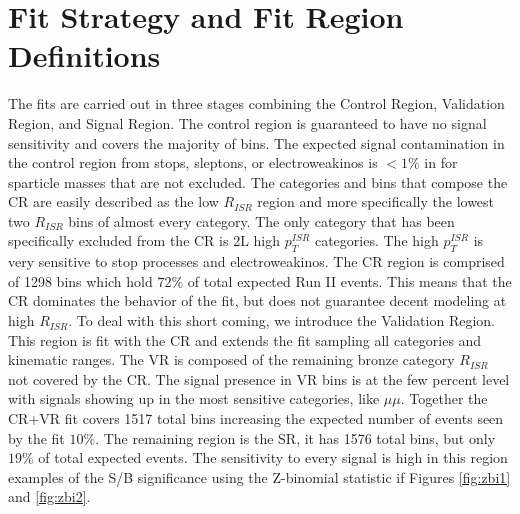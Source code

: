 \section{Fit Strategy and Fit Region Definitions}
The fits are carried out in three stages combining the Control Region, Validation Region, and Signal Region. The control region is guaranteed to have no signal sensitivity and covers the majority of bins. The expected signal contamination in the control region from stops, sleptons, or electroweakinos is $<1\%$ in for sparticle masses that are not excluded. The categories and bins that compose the CR are easily described as the low $R_{ISR}$ region and more specifically the lowest two $R_{ISR}$ bins of almost every category. The only category that has been specifically excluded from the CR is 2L high $p_T^{ISR}$ categories. The high $p_T^{ISR}$ is very sensitive to stop processes and electroweakinos. The CR region is comprised of 1298 bins which hold $72\%$ of total expected Run II events. This means that the CR dominates the behavior of the fit, but does not guarantee decent modeling at high $R_{ISR}$. To deal with this short coming, we introduce the Validation Region. This region is fit with the CR and extends the fit sampling all categories and kinematic ranges. The VR is composed of the remaining bronze category $R_{ISR}$ not covered by the CR. The signal presence in VR bins is at the few percent level with signals showing up in the most sensitive categories, like $\mu\mu$. Together the CR+VR fit covers 1517 total bins increasing the expected number of events seen by the fit $10\%$. The remaining region is the SR, it has 1576 total bins, but only $19\%$ of total expected events. The sensitivity to every signal is high in this region examples of the S/B significance using the Z-binomial statistic if Figures \ref{fig:zbi1} and \ref{fig:zbi2}.







